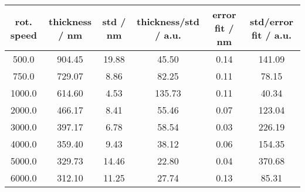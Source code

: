 \begin{tabular}{cccccc}
\toprule
rot. speed &  thickness / nm &  std / nm &  thickness/std / a.u. &  error fit / nm &  std/error fit / a.u. \\
\midrule
  500.0 &          904.45 &     19.88 &                 45.50 &            0.14 &                141.09 \\
  750.0 &          729.07 &      8.86 &                 82.25 &            0.11 &                 78.15 \\
 1000.0 &          614.60 &      4.53 &                135.73 &            0.11 &                 40.34 \\
 2000.0 &          466.17 &      8.41 &                 55.46 &            0.07 &                123.04 \\
 3000.0 &          397.17 &      6.78 &                 58.54 &            0.03 &                226.19 \\
 4000.0 &          359.40 &      9.43 &                 38.12 &            0.06 &                154.35 \\
 5000.0 &          329.73 &     14.46 &                 22.80 &            0.04 &                370.68 \\
 6000.0 &          312.10 &     11.25 &                 27.74 &            0.13 &                 85.31 \\
\bottomrule
\end{tabular}
